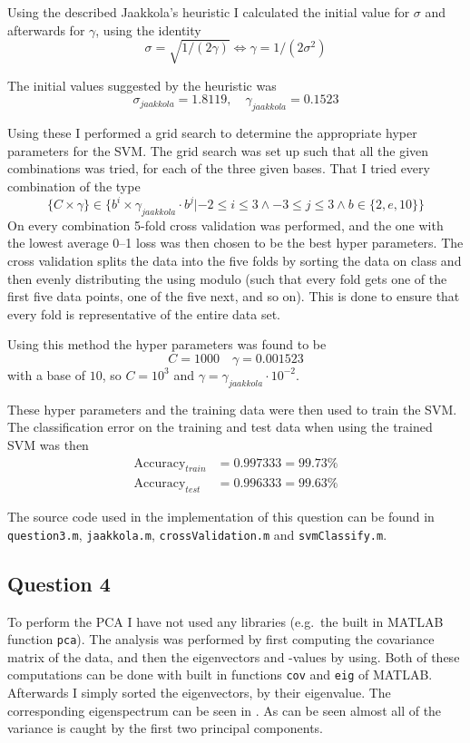 \documentclass[a4paper, 11pt]{article}
\begin{document}
Using the described Jaakkola's heuristic I calculated the initial value for $\sigma$ and afterwards for $\gamma$, using the identity
\[
    \sigma = \sqrt{1 / (2 \gamma)} \Leftrightarrow \gamma = 1 / (2 \sigma^2)
\]

The initial values suggested by the heuristic was
\[
    \sigma_{\mathit{jaakkola}} = 1.8119,\quad \gamma_{\mathit{jaakkola}} = 0.1523
\]

Using these I performed a grid search to determine the appropriate hyper parameters for the SVM\@. The grid search was set up such that all the given combinations was tried, for each of the three given bases. That I tried every combination of the type
\[
    \lbrace C \times \gamma \rbrace \in \lbrace b^i \times \gamma_{\mathit{jaakkola}} \cdot b^j | -2 \le i \le 3 \wedge -3 \le j \le 3 \wedge b \in \lbrace 2, e, 10 \rbrace \rbrace
\]
On every combination 5-fold cross validation was performed, and the one with the lowest average 0--1 loss was then chosen to be the best hyper parameters. The cross validation splits the data into the five folds by sorting the data on class and then evenly distributing the using modulo (such that every fold gets one of the first five data points, one of the five next, and so on). This is done to ensure that every fold is representative of the entire data set.

Using this method the hyper parameters was found to be
\[
    C = 1000 \quad \gamma = 0.001523
\]
with a base of $10$, so $C = 10^3$ and $\gamma = \gamma_{\mathit{jaakkola}} \cdot 10^{-2}$.

These hyper parameters and the training data were then used to train the SVM\@. The classification error on the training and test data when using the trained SVM was then
\begin{align*}
    \mathrm{Accuracy}_{\mathit{train}} &= 0.997333 = 99.73 \% \\
    \mathrm{Accuracy}_{\mathit{test}} &= 0.996333 = 99.63 \%
\end{align*}

The source code used in the implementation of this question can be found in \texttt{question3.m}, \texttt{jaakkola.m}, \texttt{crossValidation.m} and \texttt{svmClassify.m}.

\subsection*{Question 4}
To perform the PCA I have not used any libraries (e.g.\ the built in MATLAB function \texttt{pca}). The analysis was performed by first computing the covariance matrix of the data, and then the eigenvectors and -values by using. Both of these computations can be done with built in functions \texttt{cov} and \texttt{eig} of MATLAB\@. Afterwards I simply sorted the eigenvectors, by their eigenvalue. The corresponding eigenspectrum can be seen in . As can be seen almost all of the variance is caught by the first two principal components. 
\end{document}
